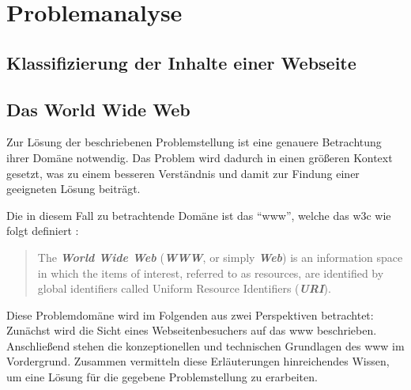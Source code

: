 \chapter{Problemanalyse}
    \label{chapter:ProblemAnalysis}
    \section{\imperia}
    \section{\wordpress}
    \section{Klassifizierung der Inhalte einer Webseite}

    
    \section{Das World Wide Web}
        Zur Lösung der beschriebenen Problemstellung ist eine genauere
        Betrachtung ihrer Domäne notwendig.
        Das Problem wird dadurch in einen größeren Kontext gesetzt,
        was zu einem besseren Verständnis und damit zur Findung
        einer geeigneten Lösung beiträgt.

        Die in diesem Fall zu betrachtende Domäne ist das "`\gls{www}"',
        welche das \gls{w3c} wie folgt definiert \cite{w3c:wwwArch}:

        \begin{quote}
            The \textit{\textbf{World Wide Web}} (\textit{\textbf{WWW}}, or simply \textit{\textbf{Web}})
            is an information space in which the items of interest, referred to as resources,
            are identified by global identifiers called Uniform Resource Identifiers (\textit{\textbf{URI}}).
        \end{quote}

        Diese Problemdomäne wird im Folgenden aus zwei Perspektiven betrachtet:
        Zunächst wird die Sicht eines Webseitenbesuchers auf das \gls{www} beschrieben.
        Anschließend stehen die konzeptionellen und technischen Grundlagen
        des \gls{www} im Vordergrund.
        Zusammen vermitteln diese Erläuterungen hinreichendes Wissen,
        um eine Lösung für die gegebene Problemstellung zu erarbeiten.

